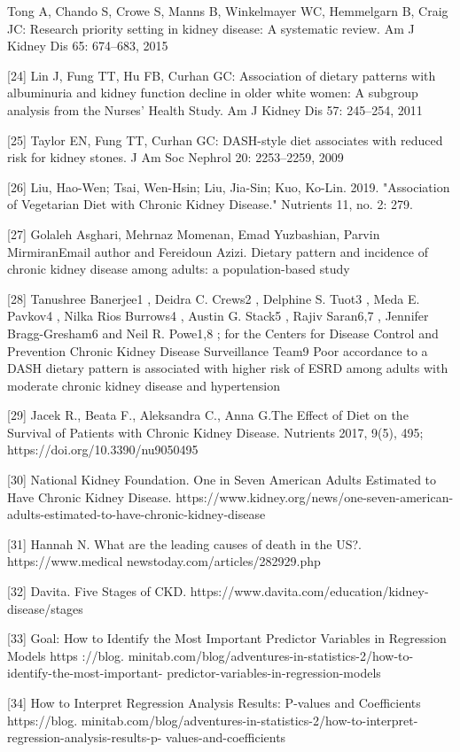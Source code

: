 \begin{flushleft}
[23]	 Tong A, Chando S, Crowe S, Manns B, Winkelmayer WC, Hemmelgarn B, Craig JC: Research priority setting in kidney disease: A systematic review. Am J Kidney Dis 65: 674–683, 2015

[24]	Lin J, Fung TT, Hu FB, Curhan GC: Association of dietary patterns with albuminuria and kidney function decline in older white women: A subgroup analysis from the Nurses’ Health Study. Am J Kidney Dis 57: 245–254, 2011 

[25]	Taylor EN, Fung TT, Curhan GC: DASH-style diet associates with reduced risk for kidney stones. J Am Soc Nephrol 20: 2253–2259, 2009 

[26]	Liu, Hao-Wen; Tsai, Wen-Hsin; Liu, Jia-Sin; Kuo, Ko-Lin. 2019. "Association of Vegetarian Diet with Chronic Kidney Disease." Nutrients 11, no. 2: 279.

[27]	Golaleh Asghari, Mehrnaz Momenan, Emad Yuzbashian, Parvin MirmiranEmail author and Fereidoun Azizi. Dietary pattern and incidence of chronic kidney disease among adults: a population-based study

[28]	Tanushree Banerjee1 , Deidra C. Crews2 , Delphine S. Tuot3 , Meda E. Pavkov4 , Nilka Rios Burrows4 , Austin G. Stack5 , Rajiv Saran6,7 , Jennifer Bragg-Gresham6 and Neil R. Powe1,8 ; for the Centers for Disease Control and Prevention Chronic Kidney Disease Surveillance Team9 Poor accordance to a DASH dietary pattern is associated with higher risk of ESRD among adults with moderate chronic kidney disease and hypertension

[29]	 Jacek R., Beata F., Aleksandra C., Anna G.The Effect of Diet on the Survival of Patients with Chronic Kidney Disease. Nutrients 2017, 9(5), 495; https://doi.org/10.3390/nu9050495

[30] National Kidney Foundation. One in Seven American Adults Estimated to Have Chronic Kidney Disease. https://www.kidney.org/news/one-seven-american-adults-estimated-to-have-chronic-kidney-disease

[31]	Hannah N. What are the leading causes of death in the US?. https://www.medical 
newstoday.com/articles/282929.php 

[32]	Davita. Five Stages of CKD. https://www.davita.com/education/kidney-disease/stages

[33]	Goal: How to Identify the Most Important Predictor Variables in Regression Models https 
://blog. minitab.com/blog/adventures-in-statistics-2/how-to-identify-the-most-important- predictor-variables-in-regression-models

[34]	How to Interpret Regression Analysis Results: P-values and Coefficients https://blog. 
minitab.com/blog/adventures-in-statistics-2/how-to-interpret-regression-analysis-results-p-
values-and-coefficients


\end{flushleft}
